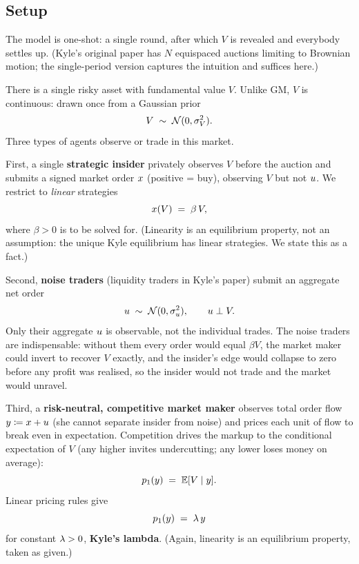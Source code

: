 \subsection{Setup}
\label{subsec:kyle_setup}

The model is one-shot: a single round, after which $V$ is revealed
and everybody settles up. (Kyle's original paper has $N$ equispaced
auctions limiting to Brownian motion; the single-period version
captures the intuition and suffices here.)

There is a single risky asset with fundamental value $V$. Unlike
GM, $V$ is continuous: drawn once from a Gaussian prior
\[
  V \;\sim\; \mathcal{N}(0, \sigma_V^2).
\]
Three types of agents observe or trade in this market.

First, a single \textbf{strategic insider} privately observes $V$
before the auction and submits a signed market order $x$
(positive = buy), observing $V$ but not $u$. We restrict to
\emph{linear} strategies
\[
  x(V) \;=\; \beta \, V,
\]
where $\beta > 0$ is to be solved for. (Linearity is an
equilibrium property, not an assumption: the unique Kyle
equilibrium has linear strategies. We state this as a fact.)

Second, \textbf{noise traders} (liquidity traders in Kyle's paper)
submit an aggregate net order
\[
  u \;\sim\; \mathcal{N}(0, \sigma_u^2), \qquad
  u \perp V.
\]
Only their aggregate $u$ is observable, not the individual
trades. The noise traders are indispensable: without them every
order would equal $\beta V$, the market maker could invert to
recover $V$ exactly, and the insider's edge would collapse to zero
before any profit was realised, so the insider would not trade
and the market would unravel.

Third, a \textbf{risk-neutral, competitive market maker} observes
total order flow $y \coloneqq x + u$ (she cannot separate
insider from noise) and prices each unit of flow to break even in
expectation. Competition drives the markup to the conditional
expectation of $V$ (any higher invites undercutting; any lower
loses money on average):
\[
  p_1(y) \;=\; \mathbb{E}[V \mid y].
\]
Linear pricing rules give
\[
  p_1(y) \;=\; \lambda \, y
\]
for constant $\lambda > 0$, \textbf{Kyle's lambda}. (Again,
linearity is an equilibrium property, taken as given.)

